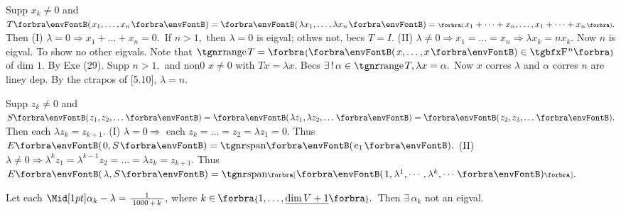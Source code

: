 Supp $x_k\neq 0$ and $T\Par{x_1,\dots,x_n}=\Par{\lambda x_1,\dots,\lambda x_n}=\BigPar{x_1+\dots+x_n,\dots,x_1+\dots+x_n}.$\parSol{}
Then (I) $\lambda=0\Rightarrow x_1+\dots+x_n=0.$ \,If $n>1,$ then $\lambda=0$ is eigval; othws not, becs $T=I.$\parSol{}
(II) $\lambda\neq 0\Rightarrow x_1=\dots=x_n\Rightarrow\lambda x_k=n x_k.$ Now $n$ is eigval.\PfEnd\vspace{2pt}\parSol{}
To show no other eigvals. \;Note that $\range T=\Bra{\Par{x,\dots,x}\in\FbbP{n}}$ of dim $1.$ By Exe (29).\PfEnd\parSol{}
\Or Supp $n>1,$ and non0 $x\neq0$ with $Tx=\lambda x.$ Becs $\exists\,!\,\alpha\in\range T,\lambda x=\alpha.$\parSol{}
Now $x$ corres $\lambda$ and $\alpha$ corres $n$ are liney dep. By the ctrapos of [5.10], $\lambda=n.$\PfEnd
\SepLine

Supp $z_k\neq 0$ and $S\Par{z_1,z_2,\dots}=\Par{\lambda z_1,\lambda z_2,\dots}=\Par{z_2,z_3,\dots}.$ Then each $\lambda z_k=z_{k+1}.$\parSol{}
(I) $\lambda=0\Rightarrow$ each $z_k=\dots=z_2=\lambda z_1=0.$ \;Thus $E\Par{0,S}=\Span{e_1}.$\parSol{}
(II) $\lambda\neq 0\Rightarrow\lambda^k z_1=\lambda^{k-1} z_2=\dots=\lambda z_k=z_{k+1}.$ \;Thus $E\Par{\lambda,S}=\Span[\Sbra]{\Par{1,\lambda^1,\cdots,\lambda^k,\cdots}}.$\PfEnd
\SepLine



Let each $\aMid{\alpha_k-\lambda}=\frac{1}{\;1000\,+\,k\;},$ where $k\in\;\!\!\Bra{1,\dots,\uline{\dim V+1}}.$ \,Then $\exists\,\alpha_k$ not an eigval.\PfEnd
\SepLine[0pt][\Blind{\BulletPointX} ]

